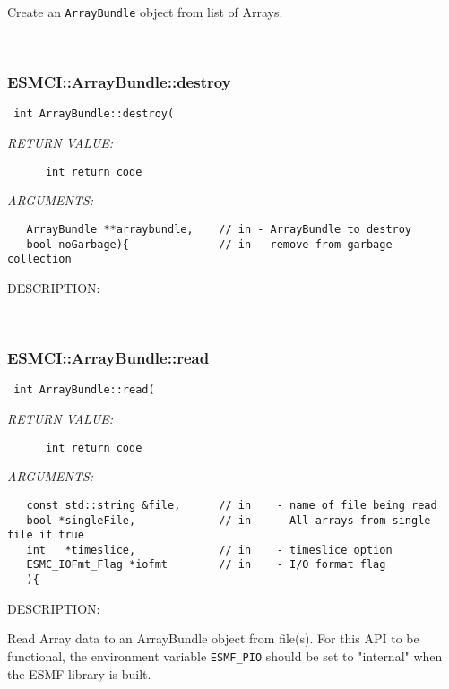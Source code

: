       Create an {\tt ArrayBundle} object from list of Arrays. 
 
\mbox{}\hrulefill\
 
\subsubsection [ESMCI::ArrayBundle::destroy] {ESMCI::ArrayBundle::destroy}


  
\begin{verbatim} int ArrayBundle::destroy(\end{verbatim}{\em RETURN VALUE:}
\begin{verbatim}      int return code\end{verbatim}{\em ARGUMENTS:}
\begin{verbatim}   ArrayBundle **arraybundle,    // in - ArrayBundle to destroy
   bool noGarbage){              // in - remove from garbage collection\end{verbatim}
{\sf DESCRIPTION:\\ }


   
 
\mbox{}\hrulefill\
 
\subsubsection [ESMCI::ArrayBundle::read] {ESMCI::ArrayBundle::read}


  
\begin{verbatim} int ArrayBundle::read(\end{verbatim}{\em RETURN VALUE:}
\begin{verbatim}      int return code\end{verbatim}{\em ARGUMENTS:}
\begin{verbatim}   const std::string &file,      // in    - name of file being read
   bool *singleFile,             // in    - All arrays from single file if true
   int   *timeslice,             // in    - timeslice option
   ESMC_IOFmt_Flag *iofmt        // in    - I/O format flag
   ){\end{verbatim}
{\sf DESCRIPTION:\\ }


     Read Array data to an ArrayBundle object from file(s).
     For this API to be functional, the environment variable {\tt ESMF\_PIO} 
     should be set to "internal" when the ESMF library is built.
   
